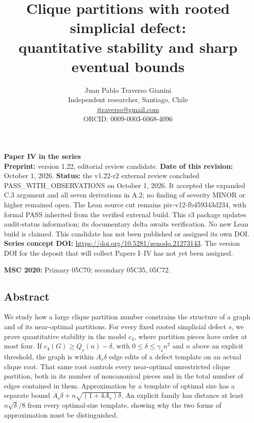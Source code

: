 \documentclass[english,11pt,a4paper]{article}
\title{Clique partitions with rooted simplicial defect:\\quantitative stability and sharp eventual bounds}
\author{Juan Pablo Traverso Gianini\\
\small Independent researcher, Santiago, Chile\\
\small \href{mailto:jtraverso@gmail.com}{jtraverso@gmail.com}\\
\small ORCID: 0009-0003-6068-4096}
\date{}
\begin{document}
\raggedbottom
\maketitle
\textbf{Paper IV in the series}\\
\textbf{Preprint:} version 1.22, editorial review candidate. \textbf{Date of this revision:} October 1, 2026. \textbf{Status:} the v1.22-r2 external review concluded {\ttfamily\small PASS\_\discretionary{\hbox{\ensuremath{\hookrightarrow}}}{}{}WITH\_\discretionary{\hbox{\ensuremath{\hookrightarrow}}}{}{}OBSERVATIONS} on October 1, 2026. It accepted the expanded C.3 argument and all seven derivations in A.2; no finding of severity MINOR or higher remained open. The Lean source cut remains {\ttfamily\small piv-\discretionary{\hbox{\ensuremath{\hookrightarrow}}}{}{}v12-\discretionary{\hbox{\ensuremath{\hookrightarrow}}}{}{}fb459343d234}, with formal PASS inherited from the verified external build. This r3 package updates audit-status information; its documentary delta awaits verification. No new Lean build is claimed. This candidate has not been published or assigned its own DOI. \textbf{Series concept DOI:} \url{https://doi.org/10.5281/zenodo.21273143}. The version DOI for the deposit that will collect Papers I--IV has not yet been assigned.

\textbf{MSC 2020:} Primary 05C70; secondary 05C35, 05C72.

\subsection{Abstract}\label{abstract}

We study how a large clique partition number constrains the structure of a graph and of its near-optimal partitions. For every fixed rooted simplicial defect \(s\), we prove quantitative stability in the model \(c_4\), where partition pieces have order at most four. If \(c_4(G)\ge Q_s(n)-\delta\), with \(0\le\delta\le\gamma_s n^2\) and \(n\) above an explicit threshold, the graph is within \(A_s\delta\) edge edits of a defect template on an actual clique root. That same root controls every near-optimal unrestricted clique partition, both in its number of noncanonical pieces and in the total number of edges contained in them. Approximation by a template of optimal size has a separate bound \(A_s\delta+n\sqrt{(1+4A_s)\delta}\). An explicit family has distance at least \(n\sqrt{\delta}/8\) from every optimal-size template, showing why the two forms of approximation must be distinguished.
\end{document}
